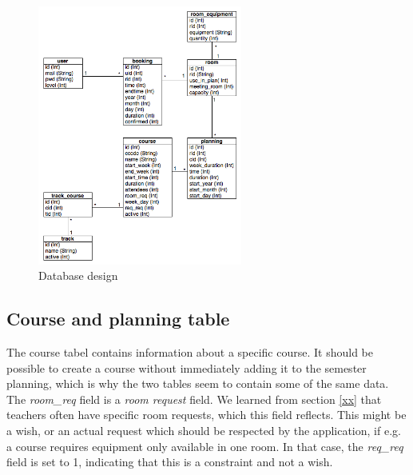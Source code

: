 \begin{figure}[htb]
\begin{center}
\leavevmode
\includegraphics[width=0.6\textwidth]{images/db-design.png}
\end{center}
\caption{Database design}
\label{fig:db_design}
\end{figure}

\subsection{Course and planning table}
\label{sub:course_planning_table}
The course tabel contains information about a specific course. It should be possible to create a course without immediately adding it to the semester planning, which is why the two tables seem to contain some of the same data. The \emph{room\_req} field is a \emph{room request} field. We learned from section \ref{xx} that teachers often have specific room requests, which this field reflects. This might be a wish, or an actual request which should be respected by the application, if e.g. a course requires equipment only available in one room. In that case, the \emph{req\_req} field is set to 1, indicating that this is a constraint and not a wish. 

